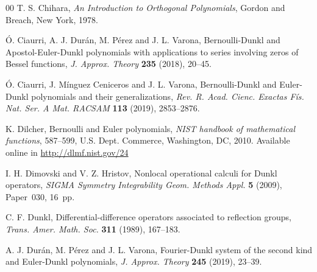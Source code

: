 \documentclass[a4paper]{amsart}
\theoremstyle{plain}
\theoremstyle{definition}
\theoremstyle{remark}
\numberwithin{equation}{section}
\begin{document}
\begin{thebibliography}{00}
T. S. Chihara,
\textit{An Introduction to Orthogonal Polynomials},
Gordon and Breach, New York, 1978.

\'O. Ciaurri, A. J. Dur\'an, M. P\'erez and J. L. Varona,
{Bernoulli-Dunkl and Apostol-Euler-Dunkl polynomials with applications to series involving zeros of Bessel functions},
\textit{J. Approx. Theory}
\textbf{235} (2018), 20--45.

\'O. Ciaurri, J. M\'inguez Ceniceros and J. L. Varona,
{Bernoulli-Dunkl and Euler-Dunkl polynomials and their generalizations},
\textit{Rev. R. Acad. Cienc. Exactas F\'is. Nat. Ser. A Mat. RACSAM}
\textbf{113} (2019), 2853--2876.




K. Dilcher,
Bernoulli and Euler polynomials,
\textit{NIST handbook of mathematical functions},
587--599, %
U.S. Dept. Commerce, Washington, DC, 2010.
Available online in \url{http://dlmf.nist.gov/24}

I. H. Dimovski and V. Z. Hristov,
Nonlocal operational calculi for Dunkl operators,
\textit{SIGMA Symmetry Integrability Geom. Methods Appl.}
\textbf{5} (2009), Paper~030, 16~pp.

C. F. Dunkl,
{Differential-difference operators associated to reflection groups},
\textit{Trans. Amer. Math. Soc.}
\textbf{311} (1989), 167--183.

A. J. Dur\'an, M. P\'erez and J. L. Varona,
{Fourier-Dunkl system of the second kind and Euler-Dunkl polynomials},
\textit{J. Approx. Theory}
\textbf{245} (2019), 23--39.


\end{thebibliography}
\end{document}
